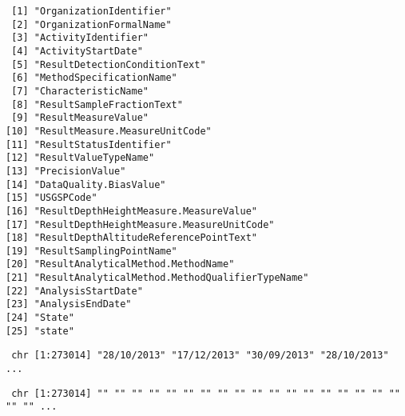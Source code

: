 \documentclass[
  12pt,
]{article}
\newenvironment{Shaded}{\begin{snugshade}}{\end{snugshade}}
\newcommand{\FunctionTok}[1]{\textcolor[rgb]{0.28,0.35,0.67}{#1}}
\newcommand{\NormalTok}[1]{\textcolor[rgb]{0.00,0.23,0.31}{#1}}
\newcommand{\SpecialCharTok}[1]{\textcolor[rgb]{0.37,0.37,0.37}{#1}}
\begin{document}
\begin{verbatim}
 [1] "OrganizationIdentifier"                        
 [2] "OrganizationFormalName"                        
 [3] "ActivityIdentifier"                            
 [4] "ActivityStartDate"                             
 [5] "ResultDetectionConditionText"                  
 [6] "MethodSpecificationName"                       
 [7] "CharacteristicName"                            
 [8] "ResultSampleFractionText"                      
 [9] "ResultMeasureValue"                            
[10] "ResultMeasure.MeasureUnitCode"                 
[11] "ResultStatusIdentifier"                        
[12] "ResultValueTypeName"                           
[13] "PrecisionValue"                                
[14] "DataQuality.BiasValue"                         
[15] "USGSPCode"                                     
[16] "ResultDepthHeightMeasure.MeasureValue"         
[17] "ResultDepthHeightMeasure.MeasureUnitCode"      
[18] "ResultDepthAltitudeReferencePointText"         
[19] "ResultSamplingPointName"                       
[20] "ResultAnalyticalMethod.MethodName"             
[21] "ResultAnalyticalMethod.MethodQualifierTypeName"
[22] "AnalysisStartDate"                             
[23] "AnalysisEndDate"                               
[24] "State"                                         
[25] "state"                                         
\end{verbatim}

\begin{Shaded}
\end{Shaded}

\begin{verbatim}
 chr [1:273014] "28/10/2013" "17/12/2013" "30/09/2013" "28/10/2013" ...
\end{verbatim}

\begin{Shaded}
\end{Shaded}

\begin{verbatim}
 chr [1:273014] "" "" "" "" "" "" "" "" "" "" "" "" "" "" "" "" "" "" "" "" ...
\end{verbatim}
\end{document}
